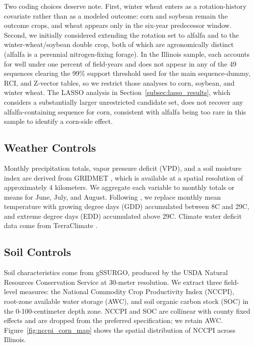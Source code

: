 \documentclass[12pt,letterpaper]{article}
\theoremstyle{remark}
\theoremstyle{remark}
\theoremstyle{plain}
\theoremstyle{definition}
\begin{document}
Two coding choices deserve note. First, winter wheat enters as a rotation-history covariate rather than as a modeled outcome: corn and soybean remain the outcome crops, and wheat appears only in the six-year predecessor window. Second, we initially considered extending the rotation set to alfalfa and to the winter-wheat/soybean double crop, both of which are agronomically distinct (alfalfa is a perennial nitrogen-fixing forage). In the Illinois sample, each accounts for well under one percent of field-years and does not appear in any of the 49 sequences clearing the 99\% support threshold used for the main sequence-dummy, RCI, and Z-vector tables, so we restrict those analyses to corn, soybean, and winter wheat. The LASSO analysis in Section~\ref{subsec:lasso_results}, which considers a substantially larger unrestricted candidate set, does not recover any alfalfa-containing sequence for corn, consistent with alfalfa being too rare in this sample to identify a corn-side effect.

\subsection{\label{subsec:w_controls}Weather Controls}
Monthly precipitation totals, vapor pressure deficit (VPD), and a soil moisture index are derived from GRIDMET \citep{Abatzoglou2013}, which is available at a spatial resolution of approximately 4 kilometers. We aggregate each variable to monthly totals or means for June, July, and August. Following \citet{SchlenkerRoberts2009}, we replace monthly mean temperature with growing degree days (GDD) accumulated between 8\textdegree C and 29\textdegree C, and extreme degree days (EDD) accumulated above 29\textdegree C. Climate water deficit data come from TerraClimate \citep{Abatzoglou2018}.

\subsection{\label{subsec:soil_controls}Soil Controls}
Soil characteristics come from gSSURGO, produced by the USDA Natural Resources Conservation Service at 30-meter resolution. We extract three field-level measures: the National Commodity Crop Productivity Index (NCCPI), root-zone available water storage (AWC), and soil organic carbon stock (SOC) in the 0-100-centimeter depth zone. NCCPI and SOC are collinear with county fixed effects and are dropped from the preferred specification; we retain AWC. Figure~\ref{fig:nccpi_corn_map} shows the spatial distribution of NCCPI across Illinois.
\end{document}
